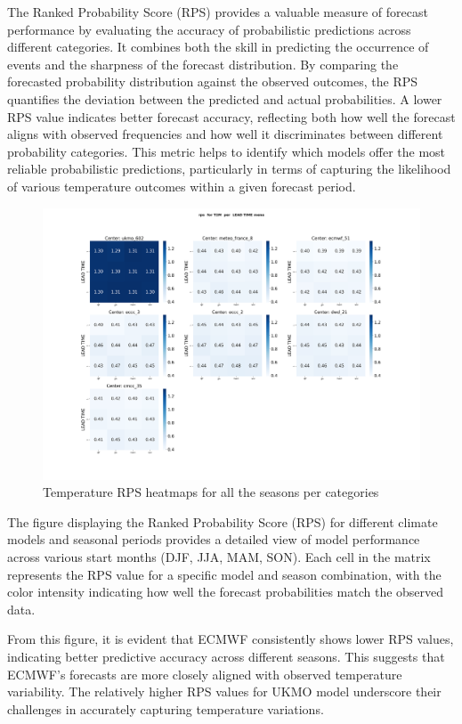The Ranked Probability Score (RPS) provides a valuable measure of forecast performance by evaluating the accuracy of probabilistic predictions across different categories. It combines both the skill in predicting the occurrence of events and the sharpness of the forecast distribution. By comparing the forecasted probability distribution against the observed outcomes, the RPS quantifies the deviation between the predicted and actual probabilities. A lower RPS value indicates better forecast accuracy, reflecting both how well the forecast aligns with observed frequencies and how well it discriminates between different probability categories. This metric helps to identify which models offer the most reliable probabilistic predictions, particularly in terms of capturing the likelihood of various temperature outcomes within a given forecast period.
\begin{figure}[H]
    \centering
    \includegraphics[width=1\linewidth]{plots/prob/rps/rps_T2M_mena.png}
    \caption{Temperature RPS  heatmaps for all the seasons per categories}
    \label{fig:CORR_djf_t2m}
\end{figure}
The figure displaying the Ranked Probability Score (RPS) for different climate models and seasonal periods provides a detailed view of model performance across various start months (DJF, JJA, MAM, SON). Each cell in the matrix represents the RPS value for a specific model and season combination, with the color intensity indicating how well the forecast probabilities match the observed data.

From this figure, it is evident that ECMWF consistently shows lower RPS values, indicating better predictive accuracy across different seasons. This suggests that ECMWF's forecasts are more closely aligned with observed temperature variability. The relatively higher RPS values for  UKMO model underscore their challenges in accurately capturing temperature variations. 

